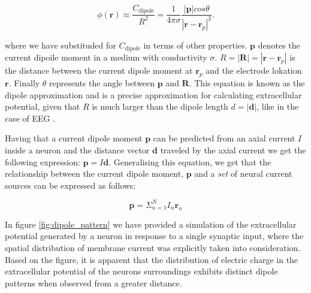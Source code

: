 \documentclass[a4paper, UKenglish, 11pt]{uiomaster}
\begin{document}
\begin{equation}
\phi(\textbf{r}) \approx \frac{C_{\text{dipole}}}{R^2} = \frac{1}{4\pi\sigma}\frac{|\textbf{p}| cos \theta}{|\textbf{r}-\textbf{r}_p|^2}.
\label{eq:extracellular_potential_approximation}
\end{equation}

where we have substituded for $C_\text{dipole}$ in terms of other properties. $\textbf{p}$ denotes the current dipoile moment in a medium with conductivity $\sigma$. $R = |\textbf{R}| = |\textbf{r} - \textbf{r}_p|$ is the distance between the current dipole moment at $\textbf{r}_p$ and the electrode lokation $\textbf{r}$. Finally $\theta$ represents the angle between $\textbf{p}$ and $\textbf{R}$. This equation is known as the dipole approximation and is a precise approximation for calculating extracellular potential, given that $R$ is much larger than the dipole length $d=|\textbf{d}|$, like in the case of EEG \cite{naess2021biophysically}.

Having that a current dipole moment $\textbf{p}$ can be predicted from an axial current $I$ inside a neuron and the distance vector $\textbf{d}$ traveled by the axial current we get the following expression: $\textbf{p} = I\textbf{d}$. Generalising this equation, we get that the relationship between the current dipole moment, $\textbf{p}$ and a \emph{set} of neural current sources can be expressed as follows:

\begin{equation}
\textbf{p} = \Sigma^N_{n=1}I_n\textbf{r}_n
\label{eq:extracellular_potential_approximation}
\end{equation}

In figure \ref{fig:dipole_pattern} we have provided a simulation of the extracellular potential generated by a neuron in response to a single synaptic input, where the spatial distribution of membrane current was explicitly taken into consideration. Based on the figure, it is apparent that the distribution of electric charge in the extracellular potential of the neurons surroundings  exhibits distinct dipole patterns when observed from a greater distance.
\end{document}
